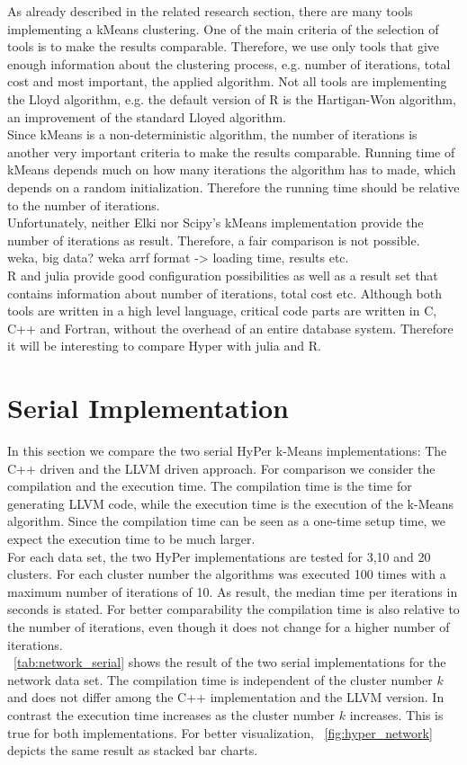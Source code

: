 As already described in the related research section, there are many tools implementing a kMeans clustering. One of the main criteria of the selection of tools is to make the results comparable. Therefore, we use only tools that give enough information about the clustering process, e.g. number of iterations, total cost and most important, the applied algorithm. Not all tools are implementing the Lloyd algorithm, e.g. the default version of R is the Hartigan-Won algorithm, an improvement of the standard Lloyed algorithm.
\\
Since kMeans is a non-deterministic algorithm, the number of iterations is another very important criteria to make the results comparable. Running time of kMeans depends much on how many iterations the algorithm has to made, which depends on a random initialization. Therefore the running time should be relative to the number of iterations.
\\
Unfortunately, neither Elki nor Scipy’s kMeans implementation provide the number of iterations as result. Therefore, a fair comparison is not possible.
\\
weka, big data?
weka arrf format -> loading time, results etc.
\\
R and julia provide good configuration possibilities as well as a result set that contains information about number of iterations, total cost etc. Although both tools are written in a high level language, critical code parts are written in C, C++ and Fortran, without the overhead of an entire database system. Therefore it will be interesting to compare Hyper with julia and R.


\section{Serial Implementation}

In this section we compare the two serial HyPer k-Means implementations: The C++ driven and the LLVM driven approach. For comparison we consider the compilation and the execution time. The compilation time is the time for generating LLVM code, while the execution time is the execution of the k-Means algorithm. Since the compilation time can be seen as a one-time setup time, we expect the execution time to be much larger. 
\\
For each data set, the two HyPer implementations are tested for 3,10 and 20 clusters. For each cluster number the algorithms was executed 100 times with a maximum number of iterations of 10. As result, the median time per iterations in seconds is stated. For better comparability the compilation time is also relative to the number of iterations, even though it does not change for a higher number of iterations.
\\
~\autoref{tab:network_serial} shows the result of the two serial implementations for the network data set. The compilation time is independent of the cluster number $k$ and does not differ among the C++ implementation and the LLVM version. In contrast the execution time increases as the cluster number $k$ increases. This is true for both implementations. For better visualization, ~\autoref{fig:hyper_network} depicts the same result as stacked bar charts.

